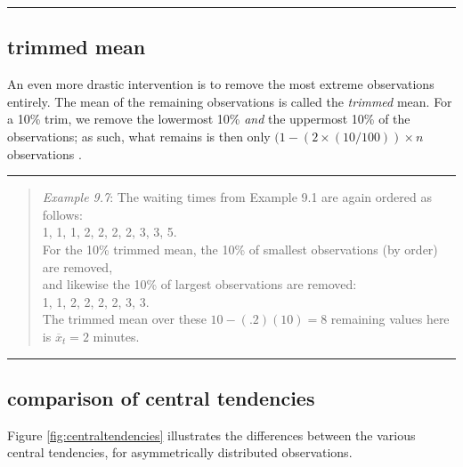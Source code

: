 \documentclass[
]{book}
\begin{document}
\begin{center}\rule{0.5\linewidth}{0.5pt}\end{center}

\hypertarget{trimmed-mean}{%
\subsection{trimmed mean}\label{trimmed-mean}}

An even more drastic intervention is to remove the most extreme observations
entirely. The mean of the remaining observations is called
the \emph{trimmed} mean. For a 10\% trim, we remove the lowermost 10\% \emph{and} the
uppermost 10\% of the observations;
as such, what remains is then only \((1- (2 \times (10/100))\times n\)
observations \citep{Wilcox12}.

\begin{center}\rule{0.5\linewidth}{0.5pt}\end{center}

\begin{quote}
\emph{Example 9.7}: The waiting times from Example 9.1
are again ordered as follows:\\
1, 1, 1, 2, 2, 2, 2, 3, 3, 5.\\
For the 10\% trimmed mean, the 10\% of smallest observations (by order) are removed,\\
and likewise the 10\% of largest observations
are removed:\\
1, 1, 2, 2, 2, 2, 3, 3.\\
The trimmed mean over these \(10-(.2)(10)=8\) remaining values here
is \(\overline{x}_t=2\) minutes.
\end{quote}

\begin{center}\rule{0.5\linewidth}{0.5pt}\end{center}

\hypertarget{comparison-of-central-tendencies}{%
\subsection{comparison of central tendencies}\label{comparison-of-central-tendencies}}

Figure \ref{fig:centraltendencies} illustrates the differences between
the various central tendencies, for asymmetrically distributed observations.
\end{document}
